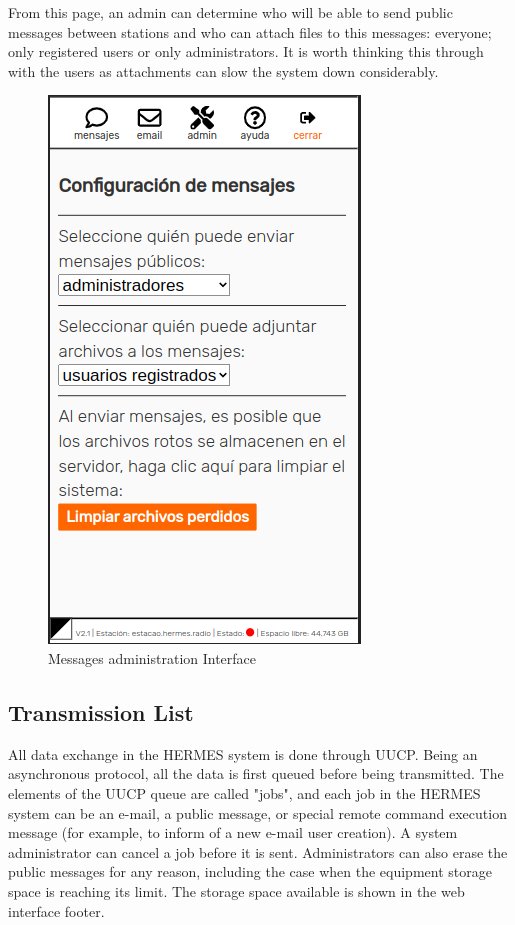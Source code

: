\documentclass[11pt,a4paper]{article}
\begin{document}
From this page, an admin can determine who will be able to send public messages between stations and who can attach files to this messages: everyone; only registered users or only administrators. It is worth thinking this through with the users as attachments can slow the system down considerably.
   
    \begin{figure}[H]
    \centering
    \includegraphics[width=0.5\columnwidth]{screenshots/frontend/es/messageadm.png}
    \caption{Messages administration Interface}
    \label{fig:messageadm}
   
    \end{figure}


\subsection{Transmission List}
\label{gui_trans_list}

All data exchange in the HERMES system is done through UUCP. Being an asynchronous protocol, all the data is first queued before being transmitted. The elements of the UUCP queue are called "jobs", and each job in the HERMES system can be an e-mail, a public message, or special remote command execution message (for example, to inform of a new e-mail user creation). A system administrator can cancel a job before it is sent. Administrators can also erase the public messages for any reason, including the case when the equipment storage space is reaching its limit. The storage space available is shown in the web interface footer.
\end{document}

